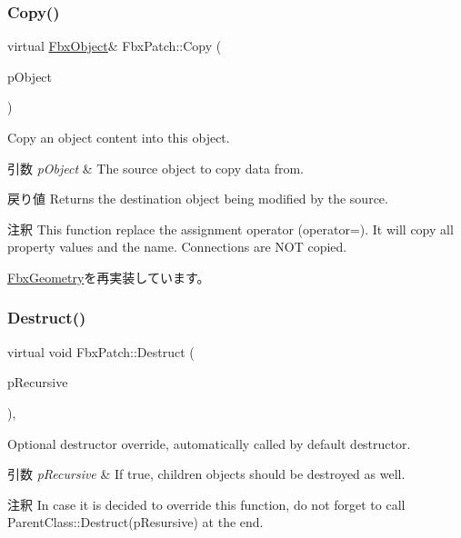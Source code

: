 \subsubsection{\texorpdfstring{Copy()}{Copy()}}
{\footnotesize\ttfamily virtual \hyperlink{class_fbx_object}{Fbx\+Object}\& Fbx\+Patch\+::\+Copy (\begin{DoxyParamCaption}\item[{const \hyperlink{class_fbx_object}{Fbx\+Object} \&}]{p\+Object }\end{DoxyParamCaption})\hspace{0.3cm}{\ttfamily [virtual]}}

Copy an object content into this object. 
\begin{DoxyParams}{引数}
{\em p\+Object} & The source object to copy data from. \\
\hline
\end{DoxyParams}
\begin{DoxyReturn}{戻り値}
Returns the destination object being modified by the source. 
\end{DoxyReturn}
\begin{DoxyRemark}{注釈}
This function replace the assignment operator (operator=). It will copy all property values and the name. Connections are N\+OT copied. 
\end{DoxyRemark}


\hyperlink{class_fbx_geometry_aac1cee4251e3d5fbd27f1181c58b83b3}{Fbx\+Geometry}を再実装しています。

\mbox{\label{class_fbx_patch_a7e094310626891214577dabe4ff145f9}} 
\subsubsection{\texorpdfstring{Destruct()}{Destruct()}}
{\footnotesize\ttfamily virtual void Fbx\+Patch\+::\+Destruct (\begin{DoxyParamCaption}\item[{bool}]{p\+Recursive }\end{DoxyParamCaption})\hspace{0.3cm}{\ttfamily [protected]}, {\ttfamily [virtual]}}

Optional destructor override, automatically called by default destructor. 
\begin{DoxyParams}{引数}
{\em p\+Recursive} & If true, children objects should be destroyed as well. \\
\hline
\end{DoxyParams}
\begin{DoxyRemark}{注釈}
In case it is decided to override this function, do not forget to call Parent\+Class\+::\+Destruct(p\+Resursive) at the end. 
\end{DoxyRemark}


